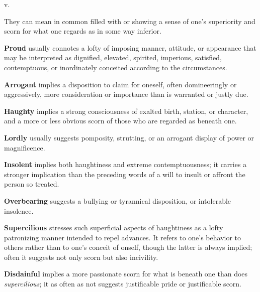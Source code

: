 \begin{description}[style=unboxed]
 v.
\begin{mynewitemize}
\item They can mean in common filled with or showing a sense of one's
superiority and scorn for what one regards as in some way inferior.
\item \textbf{Proud} usually connotes a lofty of imposing manner, attitude, or
appearance that may be interpreted as dignified, elevated, spirited, imperious,
satisfied, contemptuous, or inordinately conceited according to the
circumstances.
\item \textbf{Arrogant} implies a disposition to claim for oneself, often
domineeringly or aggressively, more consideration or importance than is
warranted or justly due.
\item \textbf{Haughty} implies a strong consciousness of exalted birth, station,
or character, and a more or less obvious scorn of those who are regarded as
beneath one.
\item \textbf{Lordly} usually suggests pomposity, strutting, or an arrogant
display of power or magnificence.
\item \textbf{Insolent} implies both haughtiness and extreme contemptuousness;
it carries a stronger implication than the preceding words of a will to insult
or affront the person so treated.
\item \textbf{Overbearing} suggests a bullying or tyrannical disposition, or
intolerable insolence.
\item \textbf{Supercilious} stresses such superficial aspects of haughtiness as
a lofty patronizing manner intended to repel advances. It refers to one's
behavior to others rather than to one's conceit of onself, though the latter is
always implied; often it suggests not only scorn but also incivility.
\item \textbf{Disdainful} implies a more passionate scorn for what is beneath
one than does \textit{supercilious}; it as often as not suggests justificable
pride or justificable scorn.
\end{mynewitemize}









\end{description}
